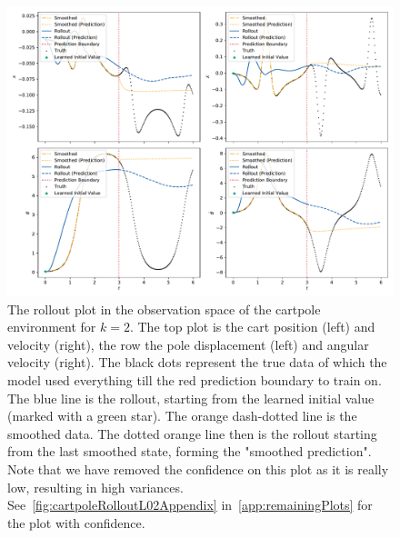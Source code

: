 		\begin{figure}
			\centering
			\includegraphics[width=\linewidth]{figures/results/cartpole-gym/run-latent-dim-02/without-confidence/rollout-observations-N0.pdf}
			\caption[Rollout of the cartpole experiment for 2 latent dimensions without confidence]{The rollout plot in the observation space of the cartpole environment for \(k = 2\). The top plot is the cart position (left) and velocity (right), the row the pole displacement (left) and angular velocity (right). The black dots represent the true data of which the model used everything till the red prediction boundary to train on. The blue line is the rollout, starting from the learned initial value (marked with a green star). The orange dash-dotted line is the smoothed data. The dotted orange line then is the rollout starting from the last smoothed state, forming the "smoothed prediction". Note that we have removed the confidence on this plot as it is really low, resulting in high variances. See~\autoref{fig:cartpoleRolloutL02Appendix} in~\autoref{app:remainingPlots} for the plot with confidence.}
			\label{fig:cartpoleRolloutL02}
		\end{figure}
